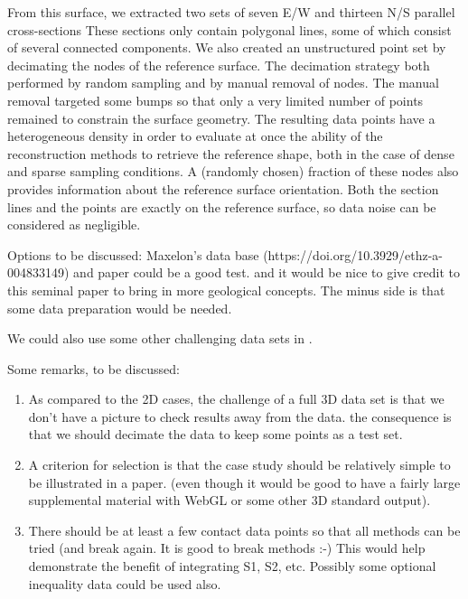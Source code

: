 \documentclass[final]{ring20}
\begin{document}
From this surface, we extracted two sets of seven E/W and thirteen N/S parallel cross-sections These sections only contain polygonal lines, some of which consist of several connected components. We also created an unstructured point set by decimating the nodes of the reference surface. The decimation strategy both performed by random sampling and by manual removal of nodes. The manual removal targeted some bumps so that only a very limited number of points remained to constrain the surface geometry. The resulting data points have a heterogeneous density in order to evaluate at once the ability of the reconstruction methods to retrieve the reference shape, both in the case of dense and sparse sampling conditions. A (randomly chosen) fraction of these nodes also provides information about the reference surface orientation. Both the section lines and the points are exactly on the reference surface, so data noise can be considered as negligible. 



Options to be discussed: Maxelon's data base (https://doi.org/10.3929/ethz-a-004833149) and paper \citep{Maxelon2009C&G} could be a good test. and it would be nice to give credit to this seminal paper to bring in more geological concepts. The minus side is that some data preparation would be needed. 

We could also use some other challenging data sets in \citep{Laurent2016EaPSL,Grose2019JoSG,Sprague2005Ga}. 

Some remarks, to be discussed: 
\begin{enumerate}
\item As compared to the 2D cases, the challenge of a full 3D data set is that we don't have a picture to check results away from the data. the consequence is that we should decimate the data to keep some points as a test set. 

\item A criterion for selection is that the case study should be relatively simple to be illustrated in a paper. (even though it would be good to have a fairly large supplemental material with WebGL or some other 3D standard output). 

\item There should be at least a few contact data points so that all methods can be tried (and break again. It is good to break methods :-) 
This would help demonstrate the benefit of integrating S1, S2, etc. Possibly some optional inequality data could be used also. 

\end{enumerate}
\end{document}
